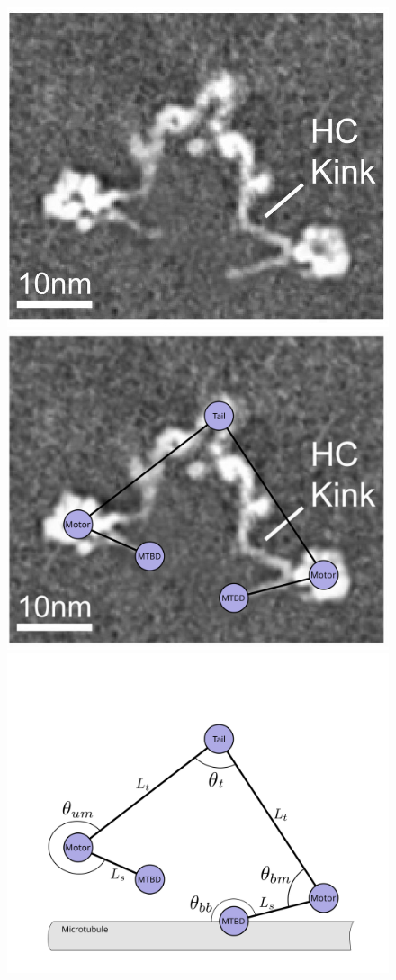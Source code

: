 \documentclass[9pt,twocolumn,twoside]{pnas-new}
\begin{document}
\begin{figure}[tbhp]
  \centering
   \includegraphics[width=0.3\columnwidth]{figures/schematic-1-cryoem}
   \includegraphics[width=0.3\columnwidth]{figures/schematic-1-superimposed}
   \includegraphics[width=0.3\columnwidth]{figures/schematic-1-model}


\end{figure}
\end{document}
